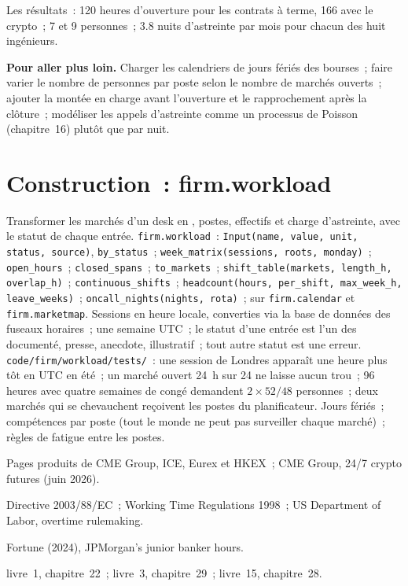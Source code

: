 Les résultats~: 120 heures d'ouverture pour les contrats à terme, 166 avec le crypto~; 7 et 9 personnes~; 3.8 nuits d'astreinte par mois pour chacun des
huit ingénieurs.

\textbf{Pour aller plus loin.} Charger les calendriers de jours fériés des bourses~; faire varier le nombre de personnes par poste selon le nombre de marchés
ouverts~; ajouter la montée en charge avant l'ouverture et le rapprochement après la clôture~; modéliser les appels d'astreinte comme un processus de Poisson
(chapitre~16) plutôt que par nuit.

\section{Construction~: firm.workload}\label{bld:in:hours-rhythm-and-intensity:workload}

\begin{build}
 Transformer les marchés d'un desk en , postes, effectifs et charge d'astreinte, avec le statut
de chaque entrée.
 \texttt{firm.workload}~: \texttt{Input(name, value, unit, status, source)}, \texttt{by\_status}~;
\texttt{week\_matrix(sessions, roots, monday)}~; \texttt{open\_hours}~; \texttt{closed\_spans}~; \texttt{to\_markets}~;
\texttt{shift\_table(markets, length\_h, overlap\_h)}~; \texttt{continuous\_shifts}~;
\texttt{headcount(hours, per\_shift, max\_week\_h, leave\_weeks)}~; \texttt{oncall\_nights(nights, rota)}~; sur \texttt{firm.calendar} et
\texttt{firm.marketmap}.
 Sessions en heure locale, converties via la base de données des fuseaux horaires~; une semaine UTC~; le statut d'une entrée est l'un des
documenté, presse, anecdote, illustratif~; tout autre statut est une erreur.
 \texttt{code/firm/workload/tests/}~: une session de Londres apparaît une heure plus tôt en UTC en été~; un
marché ouvert 24~h sur 24 ne laisse aucun trou~; 96 heures avec quatre semaines de congé demandent $2\times52/48$ personnes~; deux marchés qui se chevauchent
reçoivent les postes du planificateur.
 Jours fériés~; compétences par poste (tout le monde ne peut pas surveiller chaque marché)~; règles de fatigue entre les postes.
\end{build}

\begin{omsources}
\item Pages produits de CME Group, ICE, Eurex et HKEX~; CME Group, 24/7 crypto futures (juin 2026).
\item Directive 2003/88/EC~; Working Time Regulations 1998~; US Department of Labor, overtime rulemaking.
\item Fortune (2024), JPMorgan's junior banker hours.
\item livre~1, chapitre~22~; livre~3, chapitre~29~; livre~15, chapitre~28.
\end{omsources}

